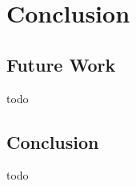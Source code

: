 \chapter{Conclusion}\label{ch:conclusion}

\section*{Future Work}\label{sec:future_work}
todo


\section*{Conclusion}\label{sec:conclusion}
todo


